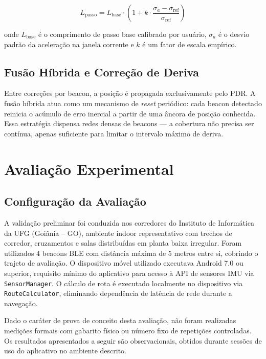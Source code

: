 \documentclass[12pt]{article}
\begin{document}
\begin{equation}
  L_{\text{passo}} = L_{\text{base}} \cdot \left(1 + k \cdot
  \frac{\sigma_a - \sigma_{\text{ref}}}{\sigma_{\text{ref}}}\right)
  \label{eq:step}
\end{equation}

\noindent onde $L_{\text{base}}$ é o comprimento de passo base calibrado por
usuário, $\sigma_a$ é o desvio padrão da aceleração na janela corrente e $k$
é um fator de escala empírico.

\subsection{Fusão Híbrida e Correção de Deriva}

Entre correções por beacon, a posição é propagada exclusivamente pelo PDR. A fusão
híbrida atua como um mecanismo de \textit{reset} periódico: cada beacon detectado
reinicia o acúmulo de erro inercial a partir de uma âncora de posição conhecida.
Essa estratégia dispensa redes densas de beacons --- a cobertura não precisa ser
contínua, apenas suficiente para limitar o intervalo máximo de deriva.

\section{Avaliação Experimental}

\subsection{Configuração da Avaliação}

A validação preliminar foi conduzida nos corredores do Instituto de Informática da UFG
(Goiânia -- GO), ambiente indoor representativo com trechos de corredor, cruzamentos
e salas distribuídas em planta baixa irregular. Foram utilizados 4 beacons BLE
com distância máxima de 5 metros entre si, cobrindo o trajeto de avaliação.
O dispositivo móvel utilizado executava Android 7.0 ou superior, requisito mínimo
do aplicativo para acesso à API de sensores IMU via \texttt{SensorManager}.
O cálculo de rota é executado localmente no dispositivo via \texttt{RouteCalculator},
eliminando dependência de latência de rede durante a navegação.

Dado o caráter de prova de conceito desta avaliação, não foram realizadas medições
formais com gabarito físico ou número fixo de repetições controladas. Os resultados
apresentados a seguir são observacionais, obtidos durante sessões de uso do
aplicativo no ambiente descrito.
\end{document}
